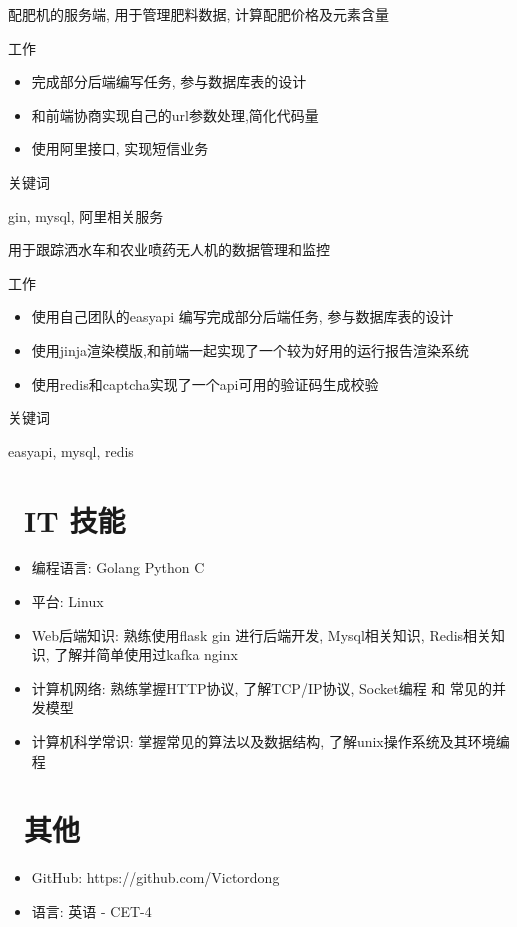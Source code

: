 \documentclass{resume}
\begin{document}
\begin{onehalfspacing}
配肥机的服务端, 用于管理肥料数据, 计算配肥价格及元素含量

工作
\begin{itemize}
  \item 完成部分后端编写任务, 参与数据库表的设计
  \item 和前端协商实现自己的url参数处理,简化代码量
  \item 使用阿里接口, 实现短信业务
\end{itemize}
关键词

gin, mysql, 阿里相关服务
\end{onehalfspacing}

\begin{onehalfspacing}
用于跟踪洒水车和农业喷药无人机的数据管理和监控

工作
\begin{itemize}
  \item 使用自己团队的easyapi 编写完成部分后端任务, 参与数据库表的设计
  \item 使用jinja渲染模版,和前端一起实现了一个较为好用的运行报告渲染系统
  \item 使用redis和captcha实现了一个api可用的验证码生成校验
\end{itemize}
关键词

easyapi, mysql, redis
\end{onehalfspacing}


\section{\faCogs\ IT 技能}
\begin{itemize}[parsep=0.5ex]
  \item 编程语言: Golang Python C
  \item 平台: Linux
  \item Web后端知识: 熟练使用flask gin 进行后端开发, Mysql相关知识, Redis相关知识, 了解并简单使用过kafka nginx 
  \item 计算机网络: 熟练掌握HTTP协议, 了解TCP/IP协议, Socket编程 和 常见的并发模型
  \item 计算机科学常识: 掌握常见的算法以及数据结构, 了解unix操作系统及其环境编程
\end{itemize}



\section{\faInfo\ 其他}
\begin{itemize}[parsep=0.5ex]
  \item GitHub: https://github.com/Victordong
  \item 语言: 英语 - CET-4
\end{itemize}

%
%
\end{document}
